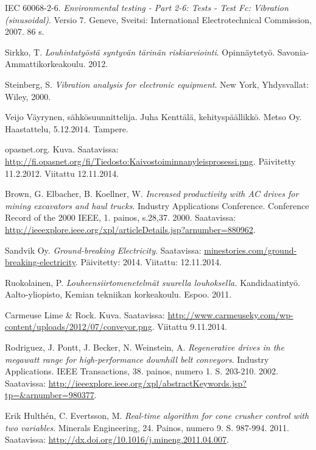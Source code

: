 \documentclass[finnish,12pt,a4paper,pdftex,elec,utf8]{aaltothesis}
\begin{document}
\begin{thebibliography}{99}
IEC 60068-2-6. \textit{Environmental testing - Part 2-6: Tests - Test Fc: Vibration (sinusoidal)}. Versio 7. Geneve, Sveitsi: International Electrotechnical Commission, 2007. 86 s.

Sirkko, T. \textit{Louhintatyöstä syntyvän tärinän riskiarviointi}. Opinnäytetyö. Savonia-Ammattikorkeakoulu. 2012.

Steinberg, S. \textit{Vibration analysis for electronic equipment}. New York, Yhdysvallat: Wiley, 2000.

Veijo Väyrynen, sähkösuunnittelija. Juha Kenttälä, kehityspäällikkö. Metso Oy. Haastattelu, 5.12.2014. Tampere.

opasnet.org. Kuva. Saatavissa: \url{http://fi.opasnet.org/fi/Tiedosto:Kaivostoiminnanyleisprosessi.png}. Päivitetty 11.2.2012. Viitattu 12.11.2014.


Brown, G. Elbacher, B. Koellner, W. \textit{Increased productivity with AC drives for mining excavators and haul trucks}. Industry Applications Conference. Conference Record of the 2000 IEEE, 1. painos, s.28,37. 2000. Saatavissa: \url{http://ieeexplore.ieee.org/xpl/articleDetails.jsp?arnumber=880962}.

Sandvik Oy. \textit{Ground-breaking Electricity}. Saatavissa: \url{minestories.com/ground-breaking-electricity}. Päivitetty: 2014. Viitattu: 12.11.2014.

Ruokolainen, P. \textit{Louheensiirtomenetelmät suurella louhoksella.} Kandidaatintyö. Aalto-yliopisto, Kemian tekniikan korkeakoulu. Espoo. 2011.

Carmeuse Lime \& Rock. Kuva. Saatavissa: \url{http://www.carmeuseky.com/wp-content/uploads/2012/07/conveyor.png}. Viitattu 9.11.2014.

Rodriguez, J. Pontt, J. Becker, N. Weinstein, A. \textit{Regenerative drives in the megawatt range for high-performance downhill belt conveyors}. Industry Applications. IEEE Transactions, 38. painos, numero 1. S. 203-210. 2002. Saatavissa: \url{http://ieeexplore.ieee.org/xpl/abstractKeywords.jsp?tp=&arnumber=980377}.

Erik Hulthén, C. Evertsson, M. \textit{Real-time algorithm for cone crusher control with two variables}. Minerals Engineering, 24. Painos, numero 9. S. 987-994. 2011.  Saatavissa: \url{http://dx.doi.org/10.1016/j.mineng.2011.04.007}.


\end{thebibliography}
\end{document}
